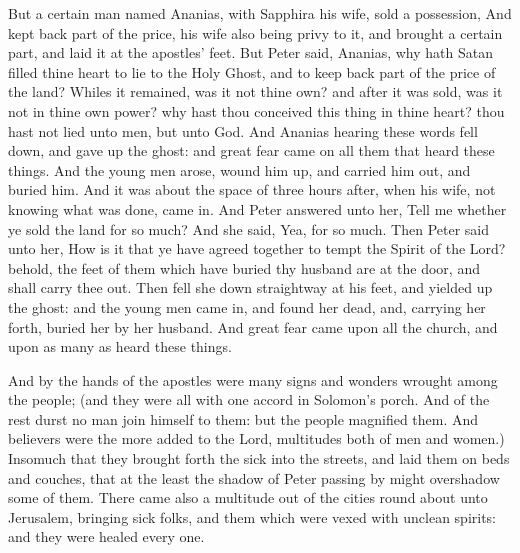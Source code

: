  But a certain man named Ananias, with Sapphira his wife,
sold a possession,  And kept back part of the price, his
wife also being privy to it, and brought a certain part, and laid it at
the apostles' feet.  But Peter said, Ananias, why hath
Satan filled thine heart to lie to the Holy Ghost, and to keep back part
of the price of the land?  Whiles it remained, was it not
thine own? and after it was sold, was it not in thine own power? why
hast thou conceived this thing in thine heart? thou hast not lied unto
men, but unto God.  And Ananias hearing these words fell
down, and gave up the ghost: and great fear came on all them that heard
these things.  And the young men arose, wound him up, and
carried him out, and buried him.  And it was about the
space of three hours after, when his wife, not knowing what was done,
came in.  And Peter answered unto her, Tell me whether ye
sold the land for so much? And she said, Yea, for so much.
 Then Peter said unto her, How is it that ye have agreed
together to tempt the Spirit of the Lord? behold, the feet of them which
have buried thy husband are at the door, and shall carry thee out.
 Then fell she down straightway at his feet, and yielded
up the ghost: and the young men came in, and found her dead, and,
carrying her forth, buried her by her husband.  And great
fear came upon all the church, and upon as many as heard these things.

 And by the hands of the apostles were many signs and
wonders wrought among the people; (and they were all with one accord in
Solomon's porch.  And of the rest durst no man join
himself to them: but the people magnified them.  And
believers were the more added to the Lord, multitudes both of men and
women.)  Insomuch that they brought forth the sick into
the streets, and laid them on beds and couches, that at the least the
shadow of Peter passing by might overshadow some of them.
 There came also a multitude out of the cities round
about unto Jerusalem, bringing sick folks, and them which were vexed
with unclean spirits: and they were healed every one.

